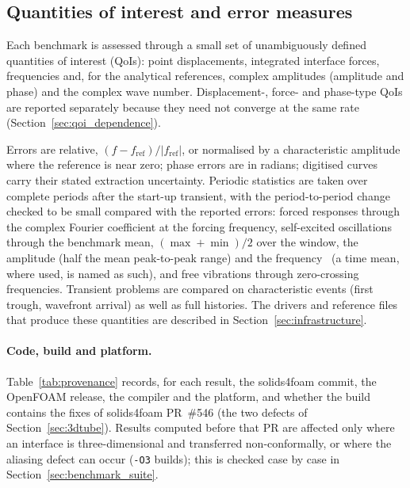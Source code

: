 \subsection{Quantities of interest and error measures}\label{sec:qoi}

Each benchmark is assessed through a small set of unambiguously defined quantities of interest (QoIs): point displacements, integrated interface forces, frequencies and, for the analytical references, complex amplitudes (amplitude and phase) and the complex wave number.
Displacement-, force- and phase-type QoIs are reported separately because they need not converge at the same rate (Section~\ref{sec:qoi_dependence}).

Errors are relative, $(f - f_\mathrm{ref})/|f_\mathrm{ref}|$, or normalised by a characteristic amplitude where the reference is near zero; phase errors are in radians; digitised curves carry their stated extraction uncertainty.
Periodic statistics are taken over complete periods after the start-up transient, with the period-to-period change checked to be small compared with the reported errors: forced responses through the complex Fourier coefficient at the forcing frequency, self-excited oscillations through the benchmark mean, $(\max+\min)/2$ over the window, the amplitude (half the mean peak-to-peak range) and the frequency~\citep{Turek2006} (a time mean, where used, is named as such), and free vibrations through zero-crossing frequencies.
Transient problems are compared on characteristic events (first trough, wavefront arrival) as well as full histories.
The drivers and reference files that produce these quantities are described in Section~\ref{sec:infrastructure}.
\paragraph{Code, build and platform.}
Table~\ref{tab:provenance} records, for each result, the solids4foam commit, the OpenFOAM release, the compiler and the platform, and whether the build contains the fixes of solids4foam PR~\#546 (the two defects of Section~\ref{sec:3dtube}).
Results computed before that PR are affected only where an interface is three-dimensional and transferred non-conformally, or where the aliasing defect can occur (\texttt{-O3} builds); this is checked case by case in Section~\ref{sec:benchmark_suite}.

